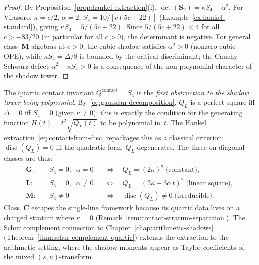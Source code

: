 \begin{proof}
By Proposition~\ref{prop:hankel-extraction}(i),
$\det(\mathbf{S}_2) = \kappa S_4 - \alpha^2$.
For Virasoro: $\kappa = c/2$, $\alpha = 2$,
$S_4 = 10/[c(5c{+}22)]$
(Example~\ref{ex:hankel-standard}), giving
$\kappa S_4 = 5/(5c{+}22)$.
Since $5/(5c{+}22) < 4$ for all $c > -83/20$
(in particular for all $c > 0$), the determinant is negative.
For general class~$\mathbf{M}$ algebras at $c > 0$,
the cubic shadow satisfies $\alpha^2 > 0$ (nonzero cubic OPE),
while $\kappa S_4 = \Delta/8$ is bounded by the
critical discriminant; the Cauchy--Schwarz defect
$\alpha^2 - \kappa S_4 > 0$ is a consequence of the
non-polynomial character of the shadow tower.
\end{proof}

\begin{remark}
\label{rem:hankel-depth}
The quartic contact invariant $Q^{\mathrm{contact}} = S_4$
is the \emph{first obstruction to the shadow tower being
polynomial}.  By~\eqref{eq:gaussian-decomposition},
$Q_L$ is a perfect square iff $\Delta = 0$ iff $S_4 = 0$
(given $\kappa \neq 0$): this is exactly the condition
for the generating function $H(t) = t^2\sqrt{Q_L(t)}$
to be polynomial in~$t$.  The Hankel
extraction~\eqref{eq:contact-from-disc}
repackages this as a classical criterion:
$\operatorname{disc}(Q_L) = 0$ iff the quadratic
form~$Q_L$ degenerates.
The three on-diagonal classes are thus:
\[
  \begin{aligned}
  \mathbf{G}: &\quad S_4 = 0,\;\; \alpha = 0
    &&\Longleftrightarrow\quad
    Q_L = (2\kappa)^2 \;\text{(constant)},\\
  \mathbf{L}: &\quad S_4 = 0,\;\; \alpha \neq 0
    &&\Longleftrightarrow\quad
    Q_L = (2\kappa + 3\alpha\,t)^2 \;\text{(linear square)},\\
  \mathbf{M}: &\quad S_4 \neq 0
    &&\Longleftrightarrow\quad
    \operatorname{disc}(Q_L) \neq 0 \;\text{(irreducible)}.
  \end{aligned}
\]
Class~$\mathbf{C}$ escapes the single-line framework
because its quartic data lives on a charged stratum
where $\kappa = 0$
(Remark~\ref{rem:contact-stratum-separation}).
The Schur complement connection to
Chapter~\ref{chap:arithmetic-shadows}
(Theorem~\ref{thm:schur-complement-quartic})
extends the extraction to the arithmetic setting,
where the shadow moments appear as Taylor coefficients
of the mixed $(s,u)$-transform.
\end{remark}

